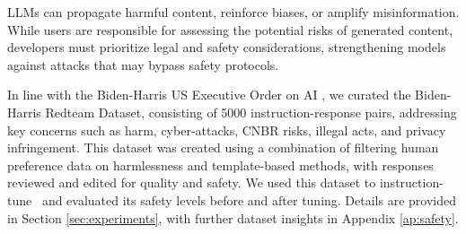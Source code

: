 LLMs can propagate harmful content, reinforce biases, or amplify misinformation. While users are responsible for assessing the potential risks of generated content, developers must prioritize legal and safety considerations, strengthening models against attacks that may bypass safety protocols. 

In line with the Biden-Harris US Executive Order on AI \citep{whitehouse2023fact}, we curated the Biden-Harris Redteam Dataset, consisting of 5000 instruction-response pairs, addressing key concerns such as harm, cyber-attacks, CNBR risks, illegal acts, and privacy infringement. This dataset was created using a combination of filtering human preference data on harmlessness and template-based methods, with responses reviewed and edited for quality and safety. We used this dataset to instruction-tune \system\ and evaluated its safety levels before and after tuning. Details are provided in Section \ref{sec:experiments}, with further dataset insights in Appendix \ref{ap:safety}.